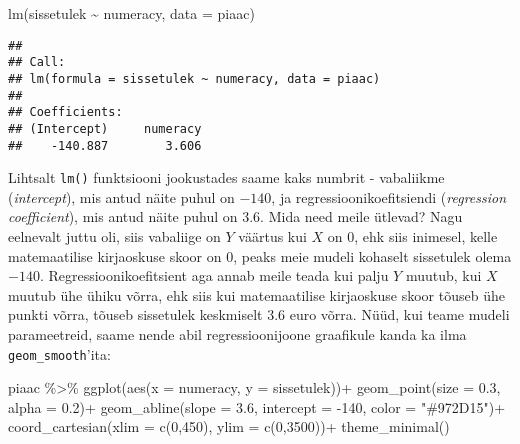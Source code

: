 \documentclass[
]{book}
\newenvironment{Shaded}{\begin{snugshade}}{\end{snugshade}}
\newcommand{\AttributeTok}[1]{\textcolor[rgb]{0.77,0.63,0.00}{#1}}
\newcommand{\DecValTok}[1]{\textcolor[rgb]{0.00,0.00,0.81}{#1}}
\newcommand{\FloatTok}[1]{\textcolor[rgb]{0.00,0.00,0.81}{#1}}
\newcommand{\FunctionTok}[1]{\textcolor[rgb]{0.00,0.00,0.00}{#1}}
\newcommand{\NormalTok}[1]{#1}
\newcommand{\SpecialCharTok}[1]{\textcolor[rgb]{0.00,0.00,0.00}{#1}}
\newcommand{\StringTok}[1]{\textcolor[rgb]{0.31,0.60,0.02}{#1}}
\begin{document}
\begin{Shaded}
\begin{Highlighting}[]
\FunctionTok{lm}\NormalTok{(sissetulek }\SpecialCharTok{\textasciitilde{}}\NormalTok{ numeracy, }\AttributeTok{data =}\NormalTok{ piaac)}
\end{Highlighting}
\end{Shaded}

\begin{verbatim}
## 
## Call:
## lm(formula = sissetulek ~ numeracy, data = piaac)
## 
## Coefficients:
## (Intercept)     numeracy  
##    -140.887        3.606
\end{verbatim}

Lihtsalt \texttt{lm()} funktsiooni jookustades saame kaks numbrit - vabaliikme (\emph{intercept}), mis antud näite puhul on \(-140\), ja regressioonikoefitsiendi (\emph{regression coefficient}), mis antud näite puhul on \(3.6\). Mida need meile ütlevad? Nagu eelnevalt juttu oli, siis vabaliige on \(Y\) väärtus kui \(X\) on \(0\), ehk siis inimesel, kelle matemaatilise kirjaoskuse skoor on \(0\), peaks meie mudeli kohaselt sissetulek olema \(-140\). Regressioonikoefitsient aga annab meile teada kui palju \(Y\) muutub, kui \(X\) muutub ühe ühiku võrra, ehk siis kui matemaatilise kirjaoskuse skoor tõuseb ühe punkti võrra, tõuseb sissetulek keskmiselt \(3.6\) euro võrra.
Nüüd, kui teame mudeli parameetreid, saame nende abil regressioonijoone graafikule kanda ka ilma \texttt{geom\_smooth}'ita:

\begin{Shaded}
\begin{Highlighting}[]
\NormalTok{piaac }\SpecialCharTok{\%\textgreater{}\%} 
  \FunctionTok{ggplot}\NormalTok{(}\FunctionTok{aes}\NormalTok{(}\AttributeTok{x =}\NormalTok{ numeracy, }\AttributeTok{y =}\NormalTok{ sissetulek))}\SpecialCharTok{+}
  \FunctionTok{geom\_point}\NormalTok{(}\AttributeTok{size =} \FloatTok{0.3}\NormalTok{, }\AttributeTok{alpha =} \FloatTok{0.2}\NormalTok{)}\SpecialCharTok{+}
  \FunctionTok{geom\_abline}\NormalTok{(}\AttributeTok{slope =} \FloatTok{3.6}\NormalTok{, }\AttributeTok{intercept =} \SpecialCharTok{{-}}\DecValTok{140}\NormalTok{, }\AttributeTok{color =} \StringTok{"\#972D15"}\NormalTok{)}\SpecialCharTok{+}
  \FunctionTok{coord\_cartesian}\NormalTok{(}\AttributeTok{xlim =} \FunctionTok{c}\NormalTok{(}\DecValTok{0}\NormalTok{,}\DecValTok{450}\NormalTok{), }\AttributeTok{ylim =} \FunctionTok{c}\NormalTok{(}\DecValTok{0}\NormalTok{,}\DecValTok{3500}\NormalTok{))}\SpecialCharTok{+}
  \FunctionTok{theme\_minimal}\NormalTok{()}
\end{Highlighting}
\end{Shaded}
\end{document}

